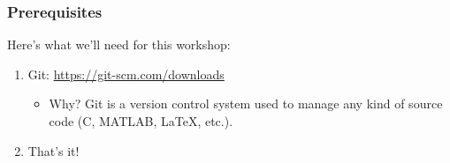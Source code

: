 \begin{frame}
    \frametitle{Prerequisites}

    Here's what we'll need for this workshop:
    \bigskip

    \begin{enumerate}[<+->]
        \setlength\itemsep{3em}
        \item Git: \url{https://git-scm.com/downloads}
        \begin{itemize}
            \item Why? Git is a version control system used to manage any kind of source code 
                  (C, MATLAB, LaTeX, etc.).
        \end{itemize}

        \item That's it!
    \end{enumerate} 
\end{frame}